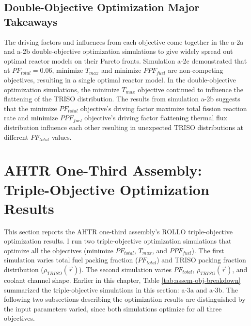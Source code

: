 \subsection{Double-Objective Optimization Major Takeaways}
The driving factors and influences from each objective come together in 
the a-2a and a-2b double-objective optimization simulations to give widely spread out
optimal reactor models on their Pareto fronts. 
Simulation a-2c demonstrated that at $PF_{total}=0.06$, minimize $T_{max}$ and 
minimize $PPF_{fuel}$ are non-competing objectives, resulting in a single optimal 
reactor model. 
In the double-objective optimization simulations, the minimize $T_{max}$ objective 
continued to influence the flattening of the TRISO distribution. 
The results from simulation a-2b suggests that the minimize $PF_{total}$ 
objective's driving factor maximize total fission reaction rate and 
minimize $PPF_{fuel}$ objective's driving factor flattening thermal flux distribution 
influence each other resulting in unexpected TRISO distributions at different 
$PF_{total}$ values. 

\section{AHTR One-Third Assembly: Triple-Objective Optimization Results}
\label{sec:assem-three-obj}
This section reports the \gls{AHTR} one-third assembly's \gls{ROLLO} triple-objective 
optimization results. 
I run two triple-objective optimization simulations that optimize all the 
objectives (minimize $PF_{total}$, $T_{max}$, and $PPF_{fuel}$). 
The first simulation varies total fuel packing fraction ($PF_{total}$) and \gls{TRISO} 
packing fraction distribution ($\rho_{TRISO}(\vec{r})$).
The second simulation varies $PF_{total}$, $\rho_{TRISO}(\vec{r})$, and coolant channel 
shape. 
Earlier in this chapter, Table \ref{tab:assem-obj-breakdown} summarized the 
triple-objective simulations in this section: a-3a and a-3b. 
The following two subsections describing the optimization results are distinguished 
by the input parameters varied, since both simulations optimize for all three 
objectives. 

